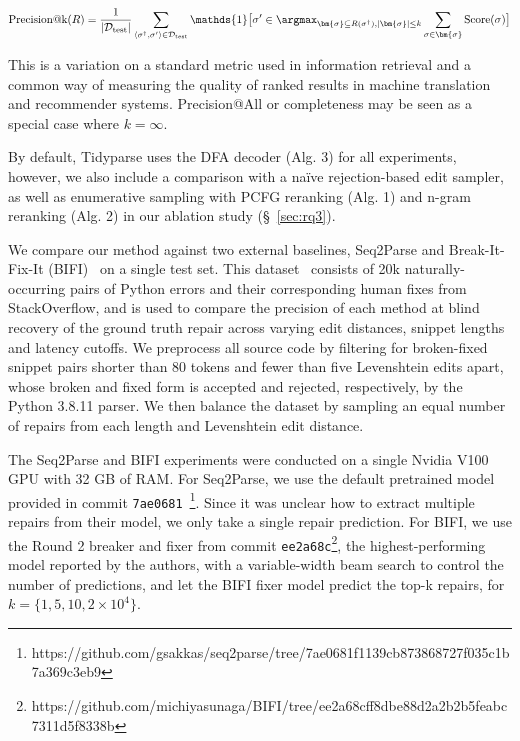\documentclass[runningheads]{llncs}
\begin{document}
\begin{equation}
\text{Precision@k}(R) = \frac{1}{|\mathcal{D}_{\text{test}}|}\sum_{\langle\sigma^\dagger, \sigma'\rangle \in \mathcal{D}_{\text{test}}} \mathds{1}\big[\sigma' \in \argmax_{\bm{\sigma} \subseteq R(\sigma^\dagger), |\bm{\sigma}| \leq k}\sum_{\sigma \in \bm{\sigma}}\text{Score}(\sigma)\big]
\end{equation}

  This is a variation on a standard metric used in information retrieval and a common way of measuring the quality of ranked results in machine translation and recommender systems. Precision@All or completeness may be seen as a special case where $k=\infty$.

  By default, Tidyparse uses the DFA decoder (Alg. 3) for all experiments, however, we also include a comparison with a na\"ive rejection-based edit sampler, as well as enumerative sampling with PCFG reranking (Alg. 1) and n-gram reranking (Alg. 2) in our ablation study (\S~\ref{sec:rq3}).

  We compare our method against two external baselines, Seq2Parse and Break-It-Fix-It (BIFI)~\cite{yasunaga2021break} on a single test set. This dataset~\cite{wong2019syntax} consists of 20k naturally-occurring pairs of Python errors and their corresponding human fixes from StackOverflow, and is used to compare the precision of each method at blind recovery of the ground truth repair across varying edit distances, snippet lengths and latency cutoffs. We preprocess all source code by filtering for broken-fixed snippet pairs shorter than 80 tokens and fewer than five Levenshtein edits apart, whose broken and fixed form is accepted and rejected, respectively, by the Python 3.8.11 parser. We then balance the dataset by sampling an equal number of repairs from each length and Levenshtein edit distance.


  The Seq2Parse and BIFI experiments were conducted on a single Nvidia V100 GPU with 32 GB of RAM. For Seq2Parse, we use the default pretrained model provided in commit \texttt{7ae0681}~\footnote{https://github.com/gsakkas/seq2parse/tree/7ae0681f1139cb873868727f035c1b7a369c3eb9}. Since it was unclear how to extract multiple repairs from their model, we only take a single repair prediction. For BIFI, we use the Round 2 breaker and fixer from commit \texttt{ee2a68c}\footnote{https://github.com/michiyasunaga/BIFI/tree/ee2a68cff8dbe88d2a2b2b5feabc7311d5f8338b}, the highest-performing model reported by the authors, with a variable-width beam search to control the number of predictions, and let the BIFI fixer model predict the top-k repairs, for $k=\{1, 5, 10, 2\times10^4\}$.
\end{document}
